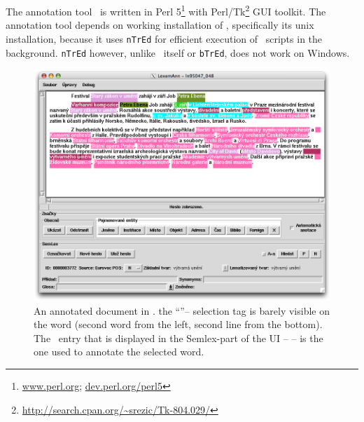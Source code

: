 
\chapter{\seman}
\label{sec:seman}
The annotation tool \seman\ is written in Perl 5\footnote{\url{www.perl.org}; \url{dev.perl.org/perl5}} with Perl/Tk\footnote{\url{http://search.cpan.org/~srezic/Tk-804.029/}} GUI toolkit. The annotation tool depends on working installation of \tred, specifically its unix installation, because it uses \texttt{nTrEd} for efficient execution of \tred\ scripts in the background. \texttt{nTrEd} however, unlike \tred\ itself or \texttt{bTrEd}, does not work on Windows.%

\begin{figure}[htbp]
   \centering
   \includegraphics[width=.9\textwidth]{images/sem-ann.png} 
   \caption{An annotated document in \seman. the ``''-- selection tag is barely visible on the word  (second word from the left, second line from the bottom). The \semlex\ entry that is displayed in the Semlex-part of the UI --  -- is the one used to annotate the selected word. }
   \label{fig:seman-gui}
\end{figure}

